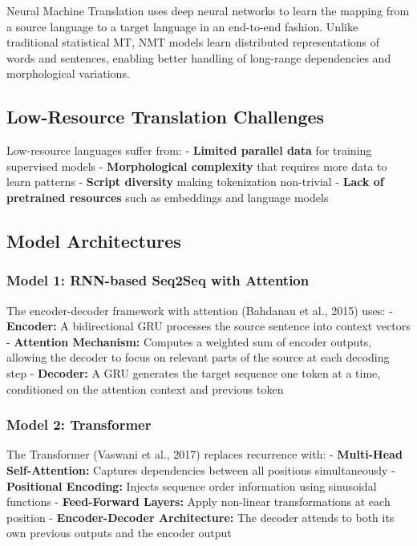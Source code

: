 \documentclass[12pt,a4paper,oneside]{report}
\begin{document}
Neural Machine Translation uses deep neural networks to learn the mapping from a source language to a target language in an end-to-end fashion. Unlike traditional statistical MT, NMT models learn distributed representations of words and sentences, enabling better handling of long-range dependencies and morphological variations.

\hypertarget{low-resource-translation-challenges}{%
\subsection{Low-Resource Translation Challenges}\label{low-resource-translation-challenges}}

Low-resource languages suffer from:
- \textbf{Limited parallel data} for training supervised models
- \textbf{Morphological complexity} that requires more data to learn patterns
- \textbf{Script diversity} making tokenization non-trivial
- \textbf{Lack of pretrained resources} such as embeddings and language models

\hypertarget{model-architectures}{%
\subsection{Model Architectures}\label{model-architectures}}

\hypertarget{model-1-rnn-based-seq2seq-with-attention}{%
\subsubsection{Model 1: RNN-based Seq2Seq with Attention}\label{model-1-rnn-based-seq2seq-with-attention}}

The encoder-decoder framework with attention (Bahdanau et al., 2015) uses:
- \textbf{Encoder:} A bidirectional GRU processes the source sentence into context vectors
- \textbf{Attention Mechanism:} Computes a weighted sum of encoder outputs, allowing the decoder to focus on relevant parts of the source at each decoding step
- \textbf{Decoder:} A GRU generates the target sequence one token at a time, conditioned on the attention context and previous token

\hypertarget{model-2-transformer}{%
\subsubsection{Model 2: Transformer}\label{model-2-transformer}}

The Transformer (Vaswani et al., 2017) replaces recurrence with:
- \textbf{Multi-Head Self-Attention:} Captures dependencies between all positions simultaneously
- \textbf{Positional Encoding:} Injects sequence order information using sinusoidal functions
- \textbf{Feed-Forward Layers:} Apply non-linear transformations at each position
- \textbf{Encoder-Decoder Architecture:} The decoder attends to both its own previous outputs and the encoder output
\end{document}
